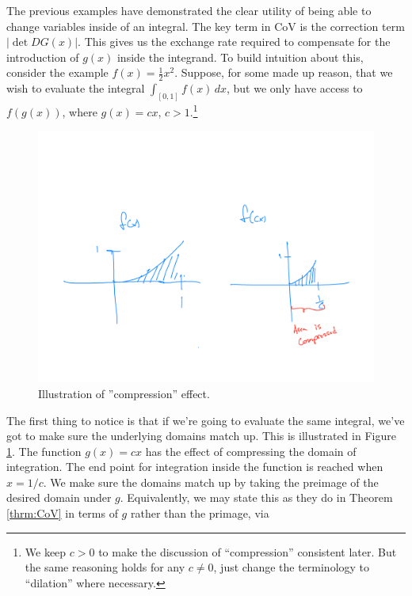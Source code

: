 \documentclass{book}
\newcommand{\dx}{\, dx}
\begin{document}
The previous examples have demonstrated the clear utility of being able to change variables inside of an integral. The key term in CoV is the correction term $\left| \det DG(x) \right| $. This gives us the exchange rate required to compensate for the introduction of $g(x)$ inside the integrand. To build intuition about this, consider the example $f(x) = \frac{1}{2}x^2$. Suppose, for some made up reason, that we wish to evaluate the integral $\int_{[0,1]} f(x)\dx$, but we only have access to $f(g(x))$, where $g(x) = cx$, $c>1$.\footnote{We keep $c>0$ to make the discussion of ``compression'' consistent later. But the same reasoning holds for any $c\not=0$, just change the terminology to ``dilation'' where necessary.}
\begin{figure}[h] \label{fig:cov-compression}
\centering
\centering
\includegraphics[scale = .21]{change_of_variables/CoV-compression.jpeg}
\caption{Illustration of ''compression'' effect.}
\end{figure}
The first thing to notice is that if we're going to evaluate the same integral, we've got to make sure the underlying domains match up. This is illustrated in Figure \ref{fig:cov-compression}. The function $g(x) = cx$ has the effect of compressing the domain of integration. The end point for integration inside the function is reached when $x=1/c$.  We make sure the domains match up by taking the preimage of the desired domain under $g$. Equivalently, we may state this as they do in Theorem \ref{thrm:CoV} in terms of $g$ rather than the primage, via 
\end{document}
